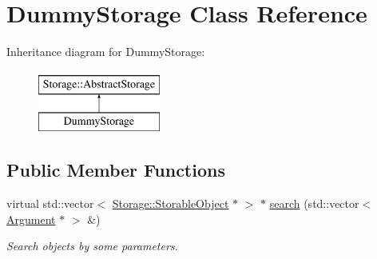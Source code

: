 \hypertarget{classDummyStorage}{
\section{DummyStorage Class Reference}
\label{d0/df2/classDummyStorage}
}
Inheritance diagram for DummyStorage:\begin{figure}[H]
\begin{center}
\leavevmode
\includegraphics[height=2.000000cm]{d0/df2/classDummyStorage}
\end{center}
\end{figure}
\subsection*{Public Member Functions}
\begin{DoxyCompactItemize}
\item 
virtual std::vector$<$ \hyperlink{classStorage_1_1StorableObject}{Storage::StorableObject} $\ast$ $>$ $\ast$ \hyperlink{classDummyStorage_adea6bbcbaacaea1a728f09602d7c8d1d}{search} (std::vector$<$ \hyperlink{structStorage_1_1AbstractStorage_1_1Argument}{Argument} $\ast$ $>$ \&)
\begin{DoxyCompactList}\small\item\em Search objects by some parameters. \item\end{DoxyCompactList}\end{DoxyCompactItemize}

